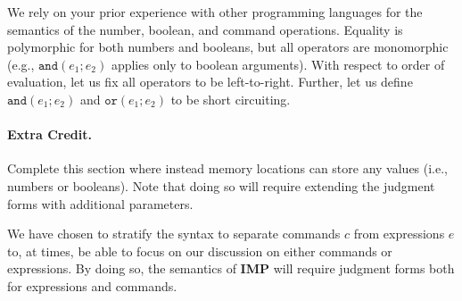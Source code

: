 \documentclass[12pt]{exam}
\newcommand{\fmtkw}[1]{\mathtt{#1}}
\newcommand{\expr}{\ensuremath{\mathit{e}}}
\newcommand{\anda}[2]{\ensuremath{\fmtkw{and}(#1; #2)}}
\newcommand{\ora}[2]{\ensuremath{\fmtkw{or}(#1; #2)}}
\newcommand{\cmd}{\ensuremath{\mathit{c}}}
\newcommand{\IMP}{\textbf{\textsf{IMP}}\xspace}
\begin{document}
We rely on your prior experience with other programming languages for the semantics of the number, boolean, and command operations. Equality is polymorphic for both numbers and booleans, but all operators are monomorphic (e.g., \anda{\expr_1}{\expr_2} applies only to boolean arguments). With respect to order of evaluation, let us fix all operators to be left-to-right. Further, let us define \anda{\expr_1}{\expr_2} and \ora{\expr_1}{\expr_2} to be short circuiting.

\paragraph{Extra Credit.} Complete this section where instead memory locations can store any values (i.e., numbers or booleans). Note that doing so will require extending the judgment forms with additional parameters.

We have chosen to stratify the syntax to separate commands $\cmd$ from expressions $\expr$ to, at times, be able to focus on our discussion on either commands or expressions. By doing so, the semantics of \IMP will require judgment forms both for expressions and commands.
\end{document}
